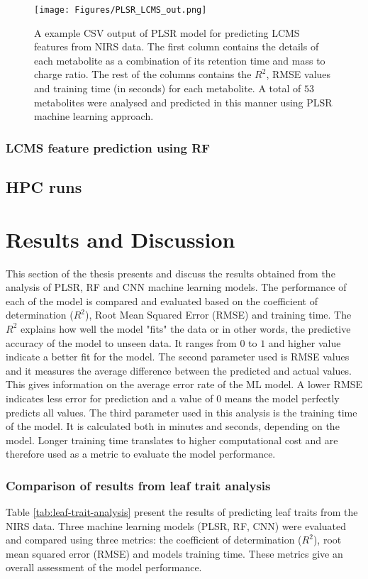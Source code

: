\documentclass[12pt,a4paper]{report}
\begin{document}
\begin{figure}[h]
    \centering
    \texttt{[image: Figures/PLSR\_LCMS\_out.png]}
    \caption{A example CSV output of PLSR model for predicting LCMS features from NIRS data. The first column contains the details of each metabolite as a combination of its retention time and mass to charge ratio. The rest of the columns contains the $R^2$, RMSE values and training time (in seconds) for each metabolite. A total of $53$ metabolites were analysed and predicted in this manner using PLSR machine learning approach.}
    \label{fig:plsr_lcms_out}
\end{figure}

\subsection{LCMS feature prediction using RF}


\section{HPC runs}


\chapter{Results and Discussion}
This section of the thesis presents and discuss the results obtained from the analysis of PLSR, RF and CNN machine learning models. The performance of each of the model is compared and evaluated based on the coefficient of determination ($R^2$), Root Mean Squared Error (RMSE) and training time. The $R^2$ explains how well the model "fits" the data or in other words, the predictive accuracy of the model to unseen data. It ranges from $0$ to $1$ and higher value indicate a better fit for the model. The second parameter used is RMSE values and it measures the average difference between the predicted and actual values. This gives information on the average error rate of the ML model. A lower RMSE indicates less error for prediction and a value of $0$ means the model perfectly predicts all values. The third parameter used in this analysis is the training time of the model. It is calculated both in minutes and seconds, depending on the model. Longer training time translates to higher computational cost and are therefore used as a metric to evaluate the model performance. \\

\subsection{Comparison of results from leaf trait analysis}
Table \ref{tab:leaf-trait-analysis} present the results of predicting leaf traits from the NIRS data. Three machine learning models (PLSR, RF, CNN) were evaluated and compared using three metrics: the coefficient of determination ($R^2$), root mean squared error (RMSE) and models training time. These metrics give an overall assessment of the model performance. \\
\end{document}

